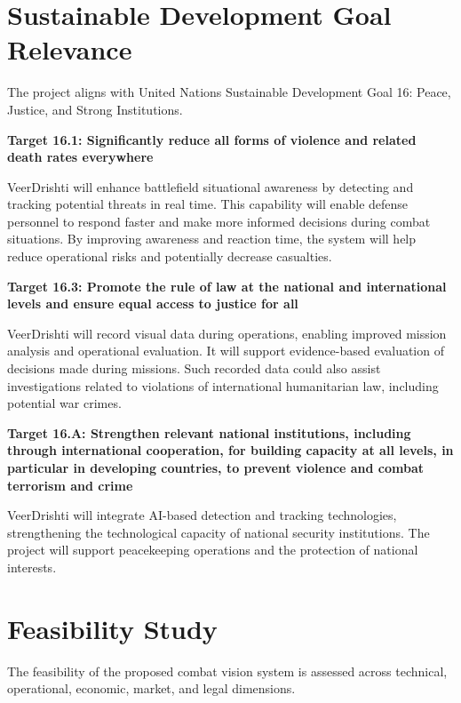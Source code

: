 \label{end:methodology}
\section{Sustainable Development Goal Relevance}\label{sec:sdg}
\setlength{\parskip}{6pt}
The project aligns with United Nations Sustainable Development Goal 16: Peace, Justice, and Strong
Institutions.

\noindent\textbf{Target 16.1: Significantly reduce all forms of violence and related death rates everywhere}

VeerDrishti will enhance battlefield situational awareness by detecting and tracking potential
threats in real time. This capability will enable defense personnel to respond faster and make more
informed decisions during combat situations. By improving awareness and reaction time, the system
 will help reduce operational risks and potentially decrease casualties.\par\medskip

\noindent\textbf{Target 16.3: Promote the rule of law at the national and international levels and ensure
  equal access to justice for all}

VeerDrishti will record visual data during operations, enabling improved mission analysis and
operational evaluation. It will support evidence-based evaluation of decisions made during missions.
Such recorded data could also assist investigations related to violations of international
humanitarian law, including potential war crimes.\par\medskip

\noindent\textbf{Target 16.A: Strengthen relevant national institutions, including through international
  cooperation, for building capacity at all levels, in particular in developing countries, to
  prevent violence and combat terrorism and crime}

VeerDrishti will integrate AI-based detection and tracking technologies, strengthening the
technological capacity of national security institutions. The project will support peacekeeping
operations and the protection of national interests.

\label{end:sdg}
\setlength{\parskip}{0pt}
\section{Feasibility Study}\label{sec:feasibility}
The feasibility of the proposed combat vision system is assessed across technical, operational,
economic, market, and legal dimensions.

